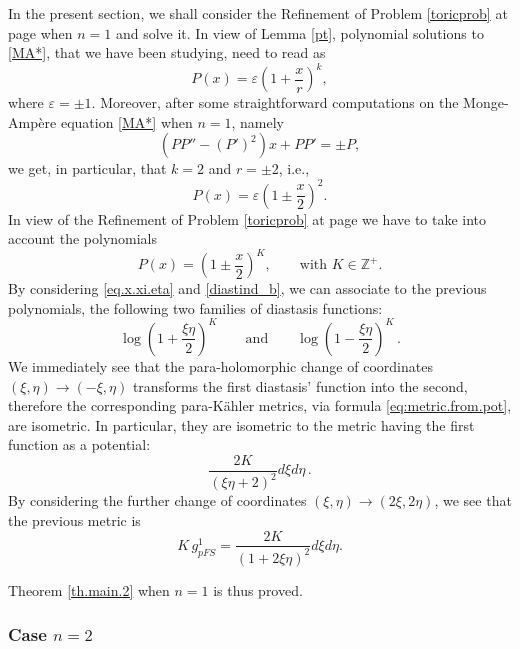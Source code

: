 \documentclass[11pt, reqno]{amsart}
\newcommand{\Z}{\mathds{Z}}
\newcommand{\e}{\varepsilon}
\newcommand{\pk }{para-K\"{a}hler }
\begin{document}
\noindent
In the present section, we shall consider the Refinement of Problem \ref{toricprob} at page \pageref{Refi} when $n=1$ and solve it. In view of Lemma \ref{pt},  polynomial solutions to \eqref{MA*}, that we have been studying, need to read as
$$P(x)=\e\left(1+ \frac{x}{r}\right)^k,$$
where $\e=\pm 1$.
Moreover, after some straightforward computations on the Monge-Ampère equation \eqref{MA*} when $n=1$, namely 
\begin{equation*}
\left(P P''-(P')^2\right)x+PP'=\pm P,
\end{equation*}
we get, in particular, that $k=2$ and $r=\pm 2$, i.e.,
$$P(x)=\e\left( 1\pm\frac{x}{2}\right)^2.$$
In view of the Refinement  of Problem \ref{toricprob} at page \pageref{Refi}
we have to take into account the polynomials
$$P(x)=\left( 1\pm\frac{x}{2}\right)^K,\qquad \text{with }K\in\Z^+.$$
By considering \eqref{eq.x.xi.eta} and \eqref{diastind_b}, we can associate to the previous polynomials, the following two families of diastasis functions:
$$
\log\left( 1+\frac{\xi\eta}{2}\right)^K\qquad\text{and}\qquad \log\left( 1-\frac{\xi\eta}{2}\right)^K\,.
$$
We immediately see that the para-holomorphic change of coordinates $(\xi,\eta)\to(-\xi,\eta)$ 
transforms the first diastasis' function into the second, therefore the corresponding \pk metrics, via formula \eqref{eq:metric.from.pot}, are isometric.  In particular, they are isometric to the metric having the first function as a potential:
$$
\frac{2K}{(\xi\eta+2)^2}d\xi d\eta\,.
$$
By considering the further change of coordinates $(\xi,\eta)\to (2\xi,2\eta)$, we see that the previous metric is $$K\, g_{pFS}^1= \frac{2K}{(1+2\xi\eta)^2} d\xi d\eta.$$

\medskip\noindent
Theorem \ref{th.main.2} when $n=1$ is thus proved. 


\subsubsection{\textbf{Case $n=2$}}\label{sec.n2}

\
\end{document}
